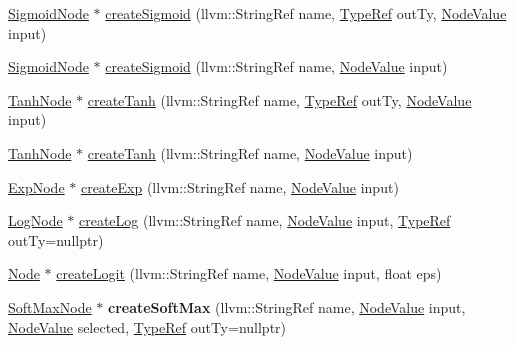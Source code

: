\begin{DoxyCompactItemize}
\item 
\hyperlink{classglow_1_1_sigmoid_node}{Sigmoid\+Node} $\ast$ \hyperlink{classglow_1_1_function_a8e62024d3d2033210f189b8f0fb19b04}{create\+Sigmoid} (llvm\+::\+String\+Ref name, \hyperlink{structglow_1_1_type}{Type\+Ref} out\+Ty, \hyperlink{structglow_1_1_node_value}{Node\+Value} input)
\item 
\hyperlink{classglow_1_1_sigmoid_node}{Sigmoid\+Node} $\ast$ \hyperlink{classglow_1_1_function_a5493f61de698fa74ca152bbb52b212aa}{create\+Sigmoid} (llvm\+::\+String\+Ref name, \hyperlink{structglow_1_1_node_value}{Node\+Value} input)
\item 
\hyperlink{classglow_1_1_tanh_node}{Tanh\+Node} $\ast$ \hyperlink{classglow_1_1_function_a859e8e441d4479750853cca69c357803}{create\+Tanh} (llvm\+::\+String\+Ref name, \hyperlink{structglow_1_1_type}{Type\+Ref} out\+Ty, \hyperlink{structglow_1_1_node_value}{Node\+Value} input)
\item 
\hyperlink{classglow_1_1_tanh_node}{Tanh\+Node} $\ast$ \hyperlink{classglow_1_1_function_a311e1981e013129cef4882a2598c36f4}{create\+Tanh} (llvm\+::\+String\+Ref name, \hyperlink{structglow_1_1_node_value}{Node\+Value} input)
\item 
\hyperlink{classglow_1_1_exp_node}{Exp\+Node} $\ast$ \hyperlink{classglow_1_1_function_af32483c4b5aff8743513d9eeec6d26fe}{create\+Exp} (llvm\+::\+String\+Ref name, \hyperlink{structglow_1_1_node_value}{Node\+Value} input)
\item 
\hyperlink{classglow_1_1_log_node}{Log\+Node} $\ast$ \hyperlink{classglow_1_1_function_a4fd96b3007929f8a2c534e72311cd6e8}{create\+Log} (llvm\+::\+String\+Ref name, \hyperlink{structglow_1_1_node_value}{Node\+Value} input, \hyperlink{structglow_1_1_type}{Type\+Ref} out\+Ty=nullptr)
\item 
\hyperlink{classglow_1_1_node}{Node} $\ast$ \hyperlink{classglow_1_1_function_a81e3b70fd3322cc3ae6f733c7c818ff2}{create\+Logit} (llvm\+::\+String\+Ref name, \hyperlink{structglow_1_1_node_value}{Node\+Value} input, float eps)
\item 
\mbox{\label{classglow_1_1_function_a2ecf62f58de6964e28f495bd3595e813}} 
\hyperlink{classglow_1_1_soft_max_node}{Soft\+Max\+Node} $\ast$ {\bfseries create\+Soft\+Max} (llvm\+::\+String\+Ref name, \hyperlink{structglow_1_1_node_value}{Node\+Value} input, \hyperlink{structglow_1_1_node_value}{Node\+Value} selected, \hyperlink{structglow_1_1_type}{Type\+Ref} out\+Ty=nullptr)
\item 

\end{DoxyCompactItemize}
